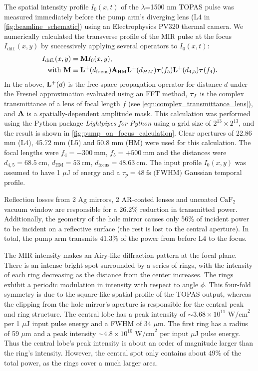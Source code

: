 The spatial intensity profile $I_0(x,t)$ of the $\lambda$=1500 nm TOPAS pulse was measured immediately before the pump arm's diverging lens (L4 in \cref{fig:beamline_schematic}) using an Electrophysics PV320 thermal camera. We numerically calculated the transverse profile of the MIR pulse at the focus $I_{\textrm{diff.}}(x,y)$ by successively applying several operators to $I_0(x,t)$:
\begin{equation}
\begin{aligned}
I_{\textrm{diff.}}(x,y) &= \vb{M} I_0(x,y), \\
\textrm{with} \ \vb{M} &\equiv \vb{L^+}(d_{\textrm{focus}}) \vb{A}_{\textrm{HM}} \vb{L^+}(d_{HM}) \vb*{\tau}(f_5) \vb{L^+}(d_{4,5}) \vb*{\tau}(f_4).
\end{aligned}
\label{eqn:IR_transverse_int_profile}
\end{equation}
In the above, $\vb{L^+}(d)$ is the free-space propagation operator for distance $d$ under the Fresnel approximation evaluated using an FFT method, $\vb*{\tau}_f$ is the complex transmittance of a lens of focal length $f$ (see \cref{eqn:complex_transmittance_lens}), and $\vb{A}$ is a spatially-dependent amplitude mask. This calculation was performed using the Python package \textit{Lightpipes for Python} \cite{vdovinLightPipesPython} using a grid size of $2^{13}\times2^{13}$, and the result is shown in \cref{fig:pump_on_focus_calculation}. Clear apertures of 22.86 mm (L4), 45.72 mm (L5) and 50.8 mm (HM) were used for this calculation. The focal lengths were $f_4 = -300 \ \textrm{mm}$, $f_5 = + 500 \ \textrm{mm}$ and the distances were $d_{4,5} = 68.5 \ \textrm{cm}$, $d_{\textrm{HM}} = 53 \ \textrm{cm}$, $d_{\textrm{focus}} = 48.63 \ \textrm{cm}$. The input profile $I_0(x,y)$ was assumed to have 1 $\mu$J of energy and a $\tau_p = 48 \ \textrm{fs (FWHM)}$ Gaussian temporal profile.

Reflection losses from 2 Ag mirrors, 2 AR-coated lenses and uncoated $\text{CaF}_2$ vacuum window are responsible for a 26.2\% reduction in transmitted power. Additionally, the geometry of the hole mirror causes only 56\% of incident power to be incident on a reflective surface (the rest is lost to the central aperture). In total, the pump arm transmits 41.3\% of the power from before L4 to the focus.

The MIR intensity makes an Airy-like diffraction pattern at the focal plane. There is an intense bright spot surrounded by a series of rings, with the intensity of each ring decreasing as the distance from the center increases. The rings exhibit a periodic modulation in intensity with respect to angle $\phi$. This four-fold symmetry is due to the square-like spatial profile of the TOPAS output, whereas the clipping from the hole mirror's aperture is responsible for the central peak and ring structure. The central lobe has a peak intensity of $\sim 3.68 \times 10^{11} \text{ W/cm}^2$ per 1 $\mu$J input pulse energy and a FWHM of 34 $\mu$m. The first ring has a radius of 59 $\mu$m and a peak intensity $\sim 4.8 \times 10^{10} \text{ W/cm}^2$ per input $\mu$J pulse energy. Thus the central lobe's peak intensity is about an order of magnitude larger than the ring's intensity. However, the central spot only contains about 49\% of the total power, as the rings cover a much larger area.

